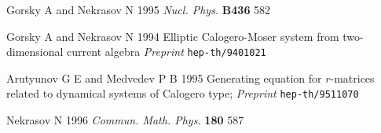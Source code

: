 \documentclass[a4paper,12pt]{article}
\begin{document}
\begin{thebibliography}{99}
  Gorsky A and Nekrasov N 1995 \textit{Nucl. Phys.} \textbf{B436}
582

 Gorsky A and Nekrasov N 1994 Elliptic Calogero-Moser
system from two-dimensional current algebra \textit{Preprint}
 \texttt{hep-th/9401021}

 Arutyunov G E and Medvedev P B 1995
Generating equation for $r$-matrices related to dynamical
systems of Calogero type; \textit{Preprint}
\texttt{hep-th/9511070}

  Nekrasov N 1996 \textit{Commun. Math. Phys.} \textbf{180}
587

\end{thebibliography}
\end{document}
